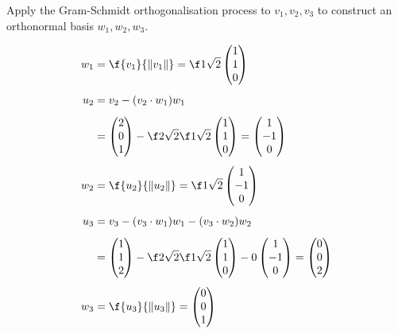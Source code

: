 \documentclass[a4paper]{article}
\begin{document}
\begin{questionbody}
Apply the Gram-Schmidt orthogonalisation process to $v_1, v_2, v_3$ to construct an orthonormal basis $w_1, w_2, w_3$.
\end{questionbody}

\begin{align*}
w_1 &= \f{v_1}{\| v_1 \|} = \f1{\sqrt 2} \begin{pmatrix}1 \\ 1 \\ 0\end{pmatrix} \\[1ex]
u_2 &= v_2 - (v_2 \cdot w_1) w_1 \\[1ex]
&= \begin{pmatrix}2 \\ 0 \\ 1\end{pmatrix} - \f2{\sqrt2} \f1{\sqrt2} \begin{pmatrix}1 \\ 1 \\ 0\end{pmatrix} = \begin{pmatrix}1 \\ -1 \\ 0\end{pmatrix} \\[1ex]
w_2 &= \f{u_2}{\| u_2 \|} = \f1{\sqrt2} \begin{pmatrix}1 \\ -1 \\ 0\end{pmatrix} \\[1ex]
u_3 &= v_3 - (v_3 \cdot w_1) w_1 - (v_3 \cdot w_2) w_2 \\[1ex]
&= \begin{pmatrix}1 \\ 1 \\ 2\end{pmatrix} - \f2{\sqrt2} \f1{\sqrt2} \begin{pmatrix}1 \\ 1 \\ 0\end{pmatrix} - 0 \begin{pmatrix}1 \\ -1 \\ 0\end{pmatrix} = \begin{pmatrix}0 \\ 0 \\ 2\end{pmatrix} \\[1ex]
w_3 &= \f{u_3}{\| u_3 \|} = \begin{pmatrix}0 \\ 0 \\ 1\end{pmatrix}
\end{align*}
\end{document}
